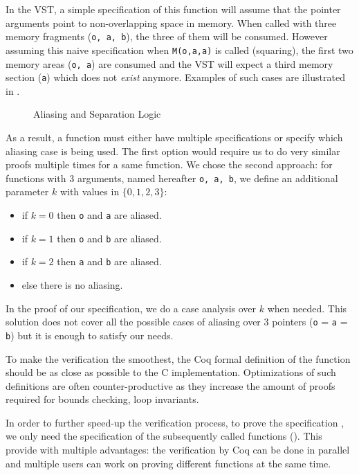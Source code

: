 In the VST, a simple specification of this function will assume that the pointer arguments
point to non-overlapping space in memory.
When called with three memory fragments (\texttt{o, a, b}),
the three of them will be consumed. However assuming this naive specification
when \texttt{M(o,a,a)} is called (squaring), the first two memory areas (\texttt{o, a})
are consumed and the VST will expect a third memory section (\texttt{a}) which does not \emph{exist} anymore.
Examples of such cases are illustrated in .
\begin{figure}[h]%
  \centering%
  \caption{Aliasing and Separation Logic}%
  \label{tikz:MemSame}%
\end{figure}
As a result, a function must either have multiple specifications or specify which
aliasing case is being used.
The first option would require us to do very similar proofs multiple times for a same function.
We chose the second approach: for functions with 3 arguments, named hereafter \texttt{o, a, b},
we define an additional parameter $k$ with values in $\{0,1,2,3\}$:
\begin{itemize}
  \item if $k=0$ then \texttt{o} and \texttt{a} are aliased.
  \item if $k=1$ then \texttt{o} and \texttt{b} are aliased.
  \item if $k=2$ then \texttt{a} and \texttt{b} are aliased.
  \item else there is no aliasing.
\end{itemize}
In the proof of our specification, we do a case analysis over $k$ when needed.
This solution does not cover all the possible cases of aliasing over 3 pointers
(\eg \texttt{o} = \texttt{a} = \texttt{b}) but it is enough to satisfy our needs.

To make the verification the smoothest, the Coq formal definition of the function
should be as close as possible to the C implementation.
Optimizations of such definitions are often counter-productive as they increase the
amount of proofs required for \eg bounds checking, loop invariants.

In order to further speed-up the verification process, to prove the specification
, we only need the specification of the subsequently
called functions (\eg {}).
This provide with multiple advantages: the verification by Coq can be
done in parallel and multiple users can work on proving different functions at
the same time.
